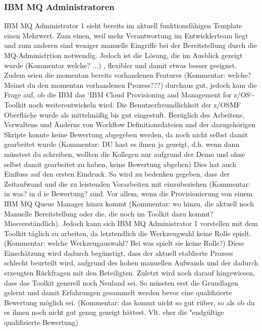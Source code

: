 \subsubsection{IBM MQ Administratoren}
IBM MQ Administrator 1 sieht bereits im aktuell funktionsfähigen Template einen Mehrwert.
Zum einen, weil mehr Verantwortung im Entwicklerteam liegt und zum anderen sind weniger manuelle Eingriffe bei der Bereitstellung durch die MQ-Administrtion notwendig.
Jedoch ist die Lösung, die im Ausblick gezeigt wurde (Kommentar welche? ...) , flexibler und damit etwas besser geeignet.
Zudem seien die momentan bereits vorhandenen Features (Kommentar: welche? Meinst du den momentan vorhandenen Prozess???) durchaus gut, jedoch kam die Frage auf, ob die IBM das `IBM Cloud Provisioning and Management for z/OS`-Toolkit noch weiterentwickeln wird.
Die Benutzerfreundlichkeit der z/OSMF Oberfläche wurde als mittelmäßig bis gut eingestuft.
Bezüglich des Arbeitens, Verwaltens und Änderns von Workflow Definitionsdateien und der dazugehörigen Skripte konnte keine Bewertung abgegeben werden, da noch nicht selbst damit gearbeitet wurde (Kommentar: DU hast es ihnen ja gezeigt, d.h. wenn dann müsstest du schreiben, wollten die Kollegen nur aufgrund der Demo und ohne selbst damit gearbeitet zu haben, keine Bewertung abgeben)
Dies hat auch Einfluss auf den ersten Eindruck. 
So wird zu bedenken gegeben, dass der Zeitaufwand und die zu leistenden Vorarbeiten mit einzubeziehen (Kommentar: in was? in d ie Bewertung? sind.
Vor allem, wenn die Provisionierung von einem IBM MQ Queue Manager hinzu kommt (Kommentar: wo hinzu, die aktuell noch Manuelle Bereitstellung oder die, die noch im Toolkit dazu kommt? Missverständlich).
Jedoch kann sich IBM MQ Administrator 1 vorstellen mit dem Toolkit täglich zu arbeiten, da letztendlich die Werkzeugwahl keine Rolle spielt. (Kommentar: welche Werkzeugauswahl? Bei was spielt sie keine Rolle?)
Diese Einschätzung  wird dadurch begünstigt, dass der aktuell etablierte Prozess schlecht beurteilt wird, aufgrund des hohen manuellen Aufwands und der dadurch erzeugten Rückfragen mit den Beteiligten.
Zuletzt wird noch darauf hingewiesen, dass das Toolkit generell noch Neuland sei.
So müssten erst die Grundlagen gelernt und damit Erfahrungen gesammelt werden bevor eine qualifizierte Bewertung möglich sei. (Kommentar: das kommt nicht so gut rüber, so als ob du es ihnen noch nicht gut genug gezeigt hättest. Vlt. eher die  "endgültige qualifizierte Bewertung)

